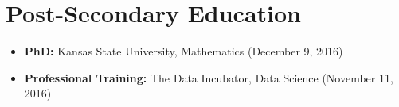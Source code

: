 \documentclass[a4paper,10pt,notitlepage]{article}
\begin{document}
\vspace{-5pt}\section*{Post-Secondary Education}
    \begin{itemize}
    \vspace{-5pt} \item \textbf{PhD:} Kansas State University, Mathematics (December 9, 2016)
    \vspace{-5pt} \item \textbf{Professional Training:} The Data Incubator, Data Science (November 11, 2016)
    \end{itemize}
\end{document}
